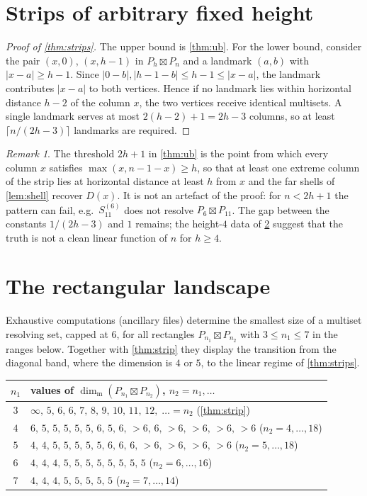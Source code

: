 \documentclass[11pt]{amsart}
\theoremstyle{remark}
\newtheorem{remark}[remark]{Remark}
\newcommand{\mdim}{\operatorname{dim}_{\mathrm m}}
\begin{document}
\section{Strips of arbitrary fixed height}\label{sec:strips}

\begin{proof}[Proof of \cref{thm:strips}]
The upper bound is \cref{thm:ub}.  For the lower bound, consider the pair $(x,0)$, $(x,h-1)$ in $P_h\boxtimes P_n$ and a landmark $(a,b)$ with $|x-a|\ge h-1$.  Since $|0-b|,|h-1-b|\le h-1\le|x-a|$, the landmark contributes $|x-a|$ to both vertices.  Hence if no landmark lies within horizontal distance $h-2$ of the column $x$, the two vertices receive identical multisets.  A single landmark serves at most $2(h-2)+1=2h-3$ columns, so at least $\lceil n/(2h-3)\rceil$ landmarks are required.
\end{proof}

\begin{remark}
The threshold $2h+1$ in \cref{thm:ub} is the point from which every column $x$ satisfies $\max(x,n-1-x)\ge h$, so that at least one extreme column of the strip lies at horizontal distance at least $h$ from $x$ and the far shells of \cref{lem:shell} recover $D(x)$.  It is not an artefact of the proof: for $n<2h+1$ the pattern can fail, e.g.\ $S^{(6)}_{11}$ does not resolve $P_6\boxtimes P_{11}$.  The gap between the constants $1/(2h-3)$ and $1$ remains; the height-$4$ data of \cref{sec:landscape} suggest that the truth is not a clean linear function of $n$ for $h\ge 4$.
\end{remark}

\section{The rectangular landscape}\label{sec:landscape}

Exhaustive computations (ancillary files) determine the smallest size of a multiset resolving set, capped at $6$, for all rectangles $P_{n_1}\boxtimes P_{n_2}$ with $3\le n_1\le 7$ in the ranges below.  Together with \cref{thm:strip} they display the transition from the diagonal band, where the dimension is $4$ or $5$, to the linear regime of \cref{thm:strips}.

\begin{center}
\begin{tabular}{c l}
\toprule
$n_1$ & values of $\mdim(P_{n_1}\boxtimes P_{n_2})$, $n_2=n_1,\dots$\\
\midrule
$3$ & $\infty,\,5,\,6,\,6,\,7,\,8,\,9,\,10,\,11,\,12,\;\dots=n_2$ (\cref{thm:strip})\\
$4$ & $6,\,5,\,5,\,5,\,5,\,5,\,6,\,5,\,6,\,{>}6,\,6,\,{>}6,\,{>}6,\,{>}6,\,{>}6$ ($n_2=4,\dots,18$)\\
$5$ & $4,\,4,\,5,\,5,\,5,\,5,\,5,\,6,\,6,\,6,\,{>}6,\,{>}6,\,{>}6,\,{>}6$ ($n_2=5,\dots,18$)\\
$6$ & $4,\,4,\,4,\,5,\,5,\,5,\,5,\,5,\,5,\,5,\,5$ ($n_2=6,\dots,16$)\\
$7$ & $4,\,4,\,4,\,5,\,5,\,5,\,5,\,5$ ($n_2=7,\dots,14$)\\
\bottomrule
\end{tabular}
\end{center}
\end{document}
